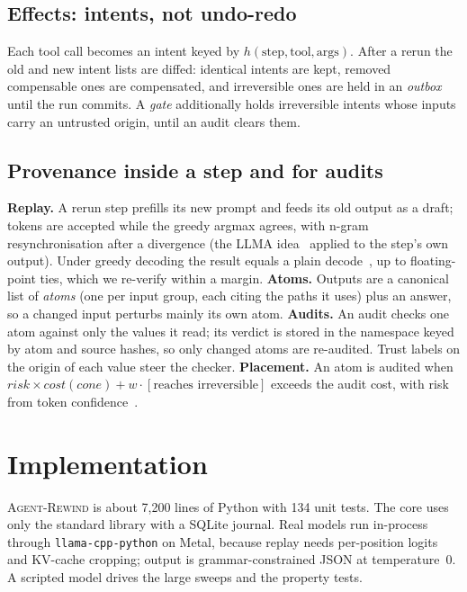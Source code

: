 \documentclass[10pt,twocolumn,letterpaper]{article}
\newcommand{\sys}{\textsc{Agent-Rewind}}
\begin{document}
\subsection{Effects: intents, not undo-redo}
Each tool call becomes an intent keyed by $h(\text{step},\text{tool},\text{args})$.
After a rerun the old and new intent lists are diffed: identical intents are kept,
removed compensable ones are compensated, and irreversible ones are held in an
\emph{outbox} until the run commits. A \emph{gate} additionally holds irreversible
intents whose inputs carry an untrusted origin, until an audit clears them.

\subsection{Provenance inside a step and for audits}
\textbf{Replay.} A rerun step prefills its new prompt and feeds its old output as
a draft; tokens are accepted while the greedy argmax agrees, with n-gram
resynchronisation after a divergence (the LLMA idea~\cite{yang2023llma} applied to
the step's own output). Under greedy decoding the result equals a plain
decode~\cite{leviathan2023fast}, up to floating-point ties, which we re-verify
within a margin.
\textbf{Atoms.} Outputs are a canonical list of \emph{atoms} (one per input group,
each citing the paths it uses) plus an answer, so a changed input perturbs mainly
its own atom.
\textbf{Audits.} An audit checks one atom against only the values it read; its
verdict is stored in the namespace keyed by atom and source hashes, so only changed
atoms are re-audited. Trust labels on the origin of each value steer the checker.
\textbf{Placement.} An atom is audited when
$\mathit{risk}\times\mathit{cost}(\mathit{cone})+w\cdot[\text{reaches irreversible}]$
exceeds the audit cost, with risk from token confidence~\cite{fu2025deepconf}.

\section{Implementation}
\label{sec:impl}

\sys{} is about 7{,}200 lines of Python with 134 unit tests. The core uses only the
standard library with a SQLite journal. Real models run in-process through
\texttt{llama-cpp-python} on Metal, because replay needs per-position logits and
KV-cache cropping; output is grammar-constrained JSON at temperature~0. A scripted
model drives the large sweeps and the property tests.
\end{document}
